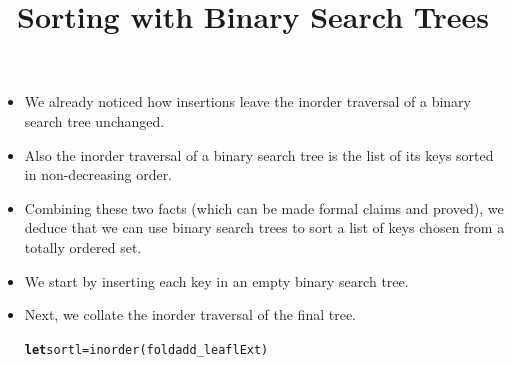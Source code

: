 \documentclass[wide]{slides}
\begin{document}
\begin{slide}
  \title{Sorting with Binary Search Trees}

  \begin{itemize}

    \item We already noticed how insertions leave the inorder
      traversal of a binary search tree unchanged.

    \item Also the inorder traversal of a binary search tree is the
      list of its keys sorted in non\hyp{}decreasing order.

    \item Combining these two facts (which can be made formal claims
      and proved), we deduce that we can use binary search trees to
      sort a list of keys chosen from a totally ordered set.

    \item We start by inserting each key in an empty binary search
      tree.

    \item Next, we collate the inorder traversal of the final tree.
      \smallskip
\begin{alltt}
\textbf{let} sort l = inorder (fold add\_leaf l Ext)
\end{alltt}

  \end{itemize}

\end{slide}
\end{document}
